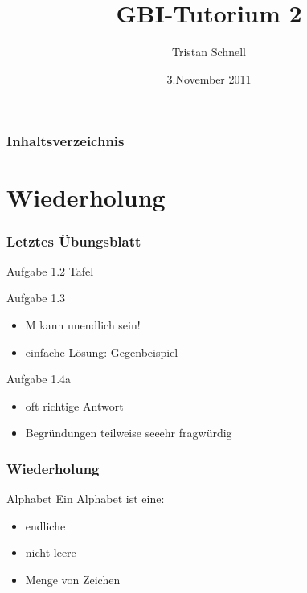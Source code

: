 \documentclass{beamer}
\author{Tristan Schnell}
\title{GBI-Tutorium 2}
\date{3.November 2011}
\begin{document}
\begin {frame}
	\titlepage
\end {frame}

\begin {frame}
	\frametitle {Inhaltsverzeichnis}
	\tableofcontents
\end {frame}

\section{Wiederholung}

\begin{frame}
	\frametitle{Letztes \"Ubungsblatt}
	\begin{block}{Aufgabe 1.2}
		Tafel
	\end{block}

	\begin{block}{Aufgabe 1.3}
	        	\begin{itemize}
			\item M kann unendlich sein!
			\item einfache Lösung: Gegenbeispiel
		\end{itemize}
	\end{block}

	\begin{block}{Aufgabe 1.4a}
		\begin{itemize}
			\item oft richtige Antwort
			\item Begründungen teilweise seeehr fragwürdig
		\end{itemize}
	\end{block}
\end{frame}

\begin {frame}
	\frametitle {Wiederholung}
	\begin{block}{Alphabet}
		Ein Alphabet ist eine:
		\pause
        		\begin{itemize}
			\item endliche
			\item nicht leere
			\item Menge von Zeichen
		\end{itemize}
	\end{block}
\end {frame}
\end{document}
